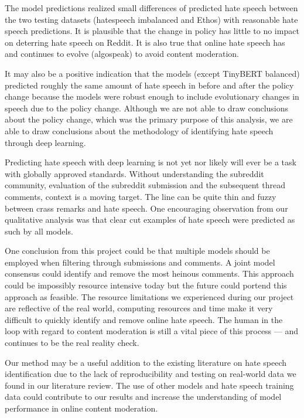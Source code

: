 \documentclass[conference]{IEEEtran}
\begin{document}
The model predictions realized small differences of predicted hate speech between the two testing datasets (hatespeech imbalanced and Ethos) with reasonable hate speech predictions. It is plausible that the change in policy has little to no impact on deterring hate speech on Reddit. It is also true that online hate speech has and continues to evolve (algospeak) to avoid content moderation. 

It may also be a positive indication that the models (except TinyBERT balanced) predicted roughly the same amount of hate speech in before and after the policy change  because the models were robust enough to include evolutionary changes in speech due to the policy change. Although we are not able to draw conclusions about the policy change, which was the primary purpose of this analysis, we are able to draw conclusions about the methodology of identifying hate speech through deep learning. 

Predicting hate speech with deep learning is not yet nor likely will ever be a task with globally approved standards. Without understanding the subreddit community, evaluation of the subreddit submission and the subsequent thread comments, context is a moving target. The line can be quite thin and fuzzy between crass remarks and hate speech. One encouraging observation from our qualitative analysis was that  clear cut examples of hate speech were predicted as such by all models. 

One conclusion from this project could be that multiple models should be employed when filtering through submissions and comments. A joint model consensus could identify and remove the most heinous comments. This approach could be impossibly resource intensive today but the future could portend this approach as feasible. The resource limitations we experienced during our project are reflective of the real world, computing resources and time make it very difficult to quickly identify and remove online hate speech. The human in the loop with regard to content moderation is still a vital piece of this process --- and continues to be the real reality check.

Our method may be a useful addition to the existing literature on hate speech identification due to the lack of reproducibility and testing on real-world data we found in our literature review. The use of other models and hate speech training data could contribute to our results and increase the understanding of model performance in online content moderation.
\end{document}
